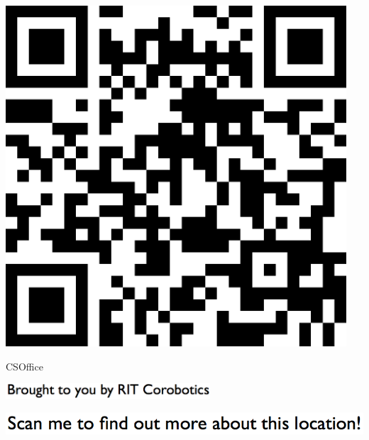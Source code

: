 \documentclass[letterpaper]{article}
\begin{document}
 \begingroup 
 \centerline{\includegraphics[scale=1,width=5in,height=5in]{CSOffice.png}} 
 \endgroup 
 \vspace*{\fill} 

 \hfill{\small CSOffice} 

  \vspace{0.7in} 
 
 \centerline{\includegraphics[scale=1,width=3in]{text-bottom.png}} 
 
 \pagebreak 
{} 
 \vspace*{\fill} 
 
  \centerline{\includegraphics[scale=1,width=6in]{text-top.png}} 
 
 \vspace{0.5in} 
 
\end{document}
